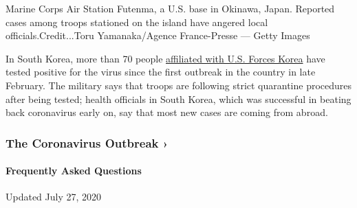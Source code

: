 Marine Corps Air Station Futenma, a U.S. base in Okinawa, Japan.
Reported cases among troops stationed on the island have angered local
officials.Credit...Toru Yamanaka/Agence France-Presse --- Getty Images

In South Korea, more than 70 people
\href{https://www.stripes.com/news/pacific/us-forces-korea-11-more-troops-from-us-test-positive-for-coronavirus-1.637307}{affiliated
with U.S. Forces Korea} have tested positive for the virus since the
first outbreak in the country in late February. The military says that
troops are following strict quarantine procedures after being tested;
health officials in South Korea, which was successful in beating back
coronavirus early on, say that most new cases are coming from abroad.

\href{https://www.nytimes.com/news-event/coronavirus?action=click\&pgtype=Article\&state=default\&region=MAIN_CONTENT_3\&context=storylines_faq}{}

\hypertarget{the-coronavirus-outbreak-}{%
\subsubsection{The Coronavirus Outbreak
›}\label{the-coronavirus-outbreak-}}

\hypertarget{frequently-asked-questions}{%
\paragraph{Frequently Asked
Questions}\label{frequently-asked-questions}}

Updated July 27, 2020

